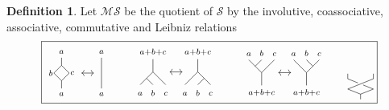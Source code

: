 \documentclass{amsart}
\renewcommand{\S}{\mathcal{S}}
\newcommand{\MS}{\mathcal{MS}}
\renewcommand{\1}{\mathbf{1}}
\theoremstyle{definition}
\newtheorem{definition}[theorem]{Definition}
\begin{document}
\begin{definition} \label{definition: MS}
	Let $\MS$ be the quotient of $\S$ by the involutive, coassociative, associative, commutative and Leibniz relations
	\begin{equation*}
	\boxed{
		\begin{tikzpicture}[scale=.48]
		\path[draw] (0,0)--(0,.5)--(-.5,1)--(0,1.5)--(0,2);
		\path[draw] (0,.5)--(.5,1)--(0,1.5);
		\node[below] at (0,0){$\scriptstyle a$};
		\node[above] at (0,2){$\scriptstyle a$};
		
		\node at (-.7,1) {$\scriptstyle b$};
		\node at (.7,1) {$\scriptstyle c$};
		
		\draw[<->] (1.3,1)--(2.1,1);
		
		\draw (2.6,2)--(2.6,0);
		
		\node[below] at (2.6,0){$\scriptstyle a$};
		\node[above] at (2.6,2){$\scriptstyle a$};
		\end{tikzpicture}	
		\qquad \
		\begin{tikzpicture}[scale=.4]
		\path[draw] (0,0)--(0,-1)--(-1,-2);
		\draw (0,-1)--(1,-2);
		\draw (-.5,-1.5)--(0,-2);
		
		\node[above] at (0,0){$\scriptstyle a+b+c$};
		\node at (-1,-2.7){$\scriptstyle a$};
		\node at (0,-2.65){$\scriptstyle b$};
		\node at (1,-2.7){$\scriptstyle c$};
		
		\draw[<->] (1.3,-1)--(2.3,-1);
		
		\path[draw] (3.5,0)--(3.5,-1)--(2.5,-2);
		\draw (3.5,-1)--(4.5,-2);
		\draw (4,-1.5)--(3.5,-2);
		
		\node[above] at (3.5,0){$\scriptstyle a+b+c$};
		\node at (2.5,-2.7){$\scriptstyle a$};
		\node at (3.5,-2.65){$\scriptstyle b$};
		\node at (4.5,-2.7){$\scriptstyle c$};
		\end{tikzpicture}
		\qquad \ 
		\begin{tikzpicture}[scale=.4]
		\path[draw] (0,0)--(0,1)--(-1,2);
		\draw (0,1)--(1,2);
		\draw (-.5,1.5)--(0,2);
		
		\node[below] at (0,0){$\scriptstyle a+b+c$};
		\node[above] at (-1,2){$\scriptstyle a$};
		\node[above] at (0,2){$\scriptstyle b$};
		\node[above] at (1,2){$\scriptstyle c$};
		
		\draw[<->] (1.3,1)--(2.3,1);
		
		\path[draw] (3.5,0)--(3.5,1)--(2.5,2);
		\draw (3.5,1)--(4.5,2);
		\draw (4,1.5)--(3.5,2);
		
		\node[below] at (3.5,0){$\scriptstyle a+b+c$};
		\node[above] at (2.5,2){$\scriptstyle a$};
		\node[above] at (3.5,2){$\scriptstyle b$};
		\node[above] at (4.5,2){$\scriptstyle c$};
		\end{tikzpicture}
		\qquad
		\begin{tikzpicture}[scale=.4]
		\path[draw] (0,0)--(0,0.4)--(-1,.8)--(1,1.6)--(1,2);
		\path[draw] (0,0.4)--(1,.8)--(0.2,1.12);
		\path[draw] (-0.2,1.28)--(-1,1.6)--(-1,2);
		

\end{tikzpicture}}
\end{equation*}
\end{definition}
\end{document}
